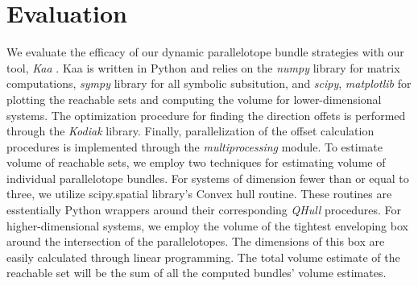 \vspace{-1em}
\section{Evaluation}
\label{sec:eval}
 We evaluate the efficacy of our dynamic parallelotope bundle strategies with our tool, \emph{Kaa} \cite{kim2020kaa}. Kaa is written in Python and relies on the \emph{numpy} library for matrix computations, \emph{sympy} library for all symbolic subsitution, and \emph{scipy}, \emph{matplotlib} for plotting the reachable sets and computing the volume for lower-dimensional systems. The optimization procedure for finding the direction offets is performed through the \emph{Kodiak} library. Finally, parallelization of the offset calculation procedures is implemented through the \emph{multiprocessing} module. To estimate volume of reachable sets, we employ two techniques for estimating volume of individual parallelotope bundles. For systems of dimension fewer than or equal to three, we utilize scipy.spatial library's Convex hull routine.
 These routines are esstentially Python wrappers around their corresponding \emph{QHull} procedures. For higher-dimensional systems, we employ the volume of the tightest enveloping box around the intersection of the parallelotopes.
 The dimensions of this box are easily calculated through linear programming. The total volume estimate of the reachable set will be the sum of all the computed bundles' volume estimates.

\vspace{-1em}
